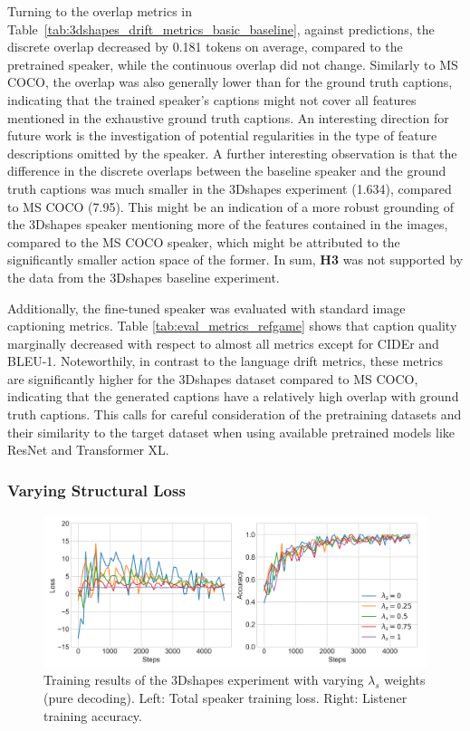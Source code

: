 Turning to the overlap metrics in Table~\ref{tab:3dshapes_drift_metrics_basic_baseline}, against predictions, the discrete overlap decreased by 0.181 tokens on average, compared to the pretrained speaker, while the continuous overlap did not change. Similarly to MS COCO, the overlap was also generally lower than for the ground truth captions, indicating that the trained speaker's captions might not cover all features mentioned in the exhaustive ground truth captions. An interesting direction for future work is the investigation of potential regularities in the type of feature descriptions omitted by the speaker. A further interesting observation is that the difference in the discrete overlaps between the baseline speaker and the ground truth captions was much smaller in the 3Dshapes experiment (1.634), compared to MS COCO (7.95). This might be an indication of a more robust grounding of the 3Dshapes speaker mentioning more of the features contained in the images, compared to the MS COCO speaker, which might be attributed to the significantly smaller action space of the former. In sum, \textbf{H3} was not supported by the data from the 3Dshapes baseline experiment.

Additionally, the fine-tuned speaker was evaluated with standard image captioning metrics. Table \ref{tab:eval_metrics_refgame} shows that caption quality marginally decreased with respect to almost all metrics except for CIDEr and BLEU-1. Noteworthily, in contrast to the language drift metrics, these metrics are significantly higher for the 3Dshapes dataset compared to MS COCO, indicating that the generated captions have a relatively high overlap with ground truth captions. This calls for careful consideration of the pretraining datasets and their similarity to the target dataset when using available pretrained models like ResNet and Transformer XL.

\subsubsection{Varying Structural Loss}

\begin{figure}[h]
	\centering
	\includegraphics[width=\linewidth]{images/shapes_refgame_49_pure_losses_all_Ls_random.png}
	\caption{Training results of the 3Dshapes experiment with varying $\lambda_s$ weights (pure decoding). Left: Total speaker training loss. Right: Listener training accuracy.}
	\label{fig:3dshapes_baseline_speaker_loss_listener_acc_all}
\end{figure}

